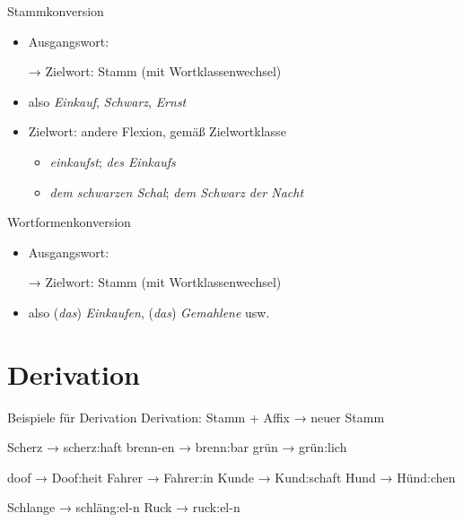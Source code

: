 \begin{frame}
  {Stammkonversion}
  \pause
  \begin{itemize}[<+->]
    \item Ausgangswort: 
    \item[→] Zielwort: Stamm \alert{(mit Wortklassenwechsel)}
      \Halbzeile
    \item also \textit{Einkauf}, \textit{Schwarz}, \textit{Ernst}
      \Halbzeile
    \item Zielwort: andere Flexion, gemäß Zielwortklasse
      \begin{itemize}[<+->]
        \item \textit{einkaufst}; \textit{des Einkaufs}
        \item \textit{dem schwarzen Schal}; \textit{dem Schwarz der Nacht}
      \end{itemize}
  \end{itemize}
\end{frame}

\begin{frame}
  {Wortformenkonversion}
  \pause
  \begin{itemize}[<+->]
    \item Ausgangswort: 
    \item[→] Zielwort: Stamm \alert{(mit Wortklassenwechsel)}
      \Halbzeile
    \item also (\textit{das}) \textit{Einkaufen}, (\textit{das}) \textit{Gemahlene} usw.
  \end{itemize}
\end{frame}

\section{Derivation}

\begin{frame}
  {Beispiele für Derivation}
  \pause
  Derivation: \alert{Stamm + Affix → neuer Stamm}
  \Halbzeile
  \pause
  \begin{exe}
    \ex
    \begin{xlist}
      \ex Scherz → scherz\alert{:haft}
      \pause
      \ex brenn-en → brenn\alert{:bar}
      \pause
      \ex grün → grün\alert{:lich}
    \end{xlist}
    \pause
    \Halbzeile
    \ex
    \begin{xlist}
      \ex doof → Doof\alert{:heit}
      \pause
      \ex Fahrer → Fahrer\alert{:in}
      \pause
      \ex Kunde → Kund\alert{:schaft}
      \pause
      \ex Hund → Hünd\alert{:chen}
    \end{xlist}
    \pause
    \Halbzeile
    \ex
    \begin{xlist}
      \ex Schlange → schläng\alert{:el}-n
      \pause
      \ex Ruck → ruck\alert{:el}-n
    \end{xlist}
  \end{exe}
\end{frame}

